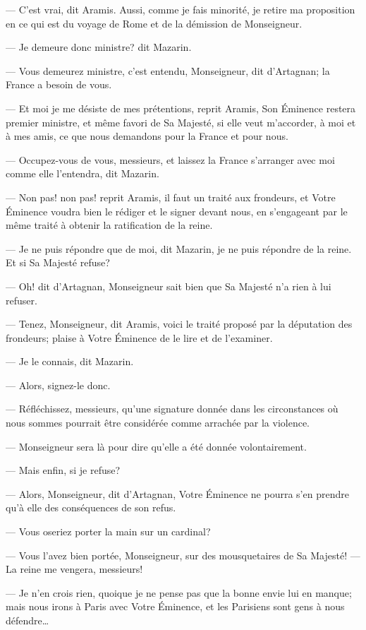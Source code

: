 — C'est vrai, dit Aramis. Aussi, comme je fais minorité, je retire ma proposition en ce qui est du voyage de Rome et de la démission de Monseigneur.

— Je demeure donc ministre? dit Mazarin.

— Vous demeurez ministre, c'est entendu, Monseigneur, dit d'Artagnan; la France a besoin de vous.

— Et moi je me désiste de mes prétentions, reprit Aramis, Son Éminence restera premier ministre, et même favori de Sa Majesté, si elle veut m'accorder, à moi et à mes amis, ce que nous demandons pour la France et pour nous.

— Occupez-vous de vous, messieurs, et laissez la France s'arranger avec moi comme elle l'entendra, dit Mazarin.

— Non pas! non pas! reprit Aramis, il faut un traité aux frondeurs, et Votre Éminence voudra bien le rédiger et le signer devant nous, en s'engageant par le même traité à obtenir la ratification de la reine.

— Je ne puis répondre que de moi, dit Mazarin, je ne puis répondre de la reine. Et si Sa Majesté refuse?

— Oh! dit d'Artagnan, Monseigneur sait bien que Sa Majesté n'a rien à lui refuser.

— Tenez, Monseigneur, dit Aramis, voici le traité proposé par la députation des frondeurs; plaise à Votre Éminence de le lire et de l'examiner.

— Je le connais, dit Mazarin.

— Alors, signez-le donc.

— Réfléchissez, messieurs, qu'une signature donnée dans les circonstances où nous sommes pourrait être considérée comme arrachée par la violence.

— Monseigneur sera là pour dire qu'elle a été donnée volontairement.

— Mais enfin, si je refuse?

— Alors, Monseigneur, dit d'Artagnan, Votre Éminence ne pourra s'en prendre qu'à elle des conséquences de son refus.

— Vous oseriez porter la main sur un cardinal?

— Vous l'avez bien portée, Monseigneur, sur des mousquetaires de Sa Majesté!
— La reine me vengera, messieurs!

— Je n'en crois rien, quoique je ne pense pas que la bonne envie lui en manque; mais nous irons à Paris avec Votre Éminence, et les Parisiens sont gens à nous défendre\dots

